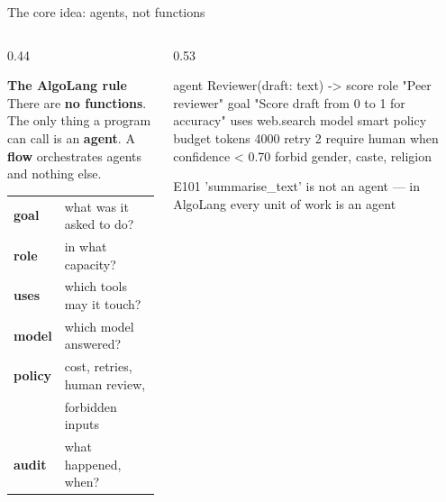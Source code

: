 \documentclass[aspectratio=169,11pt]{beamer}
\begin{document}
\begin{frame}[fragile]{The core idea: agents, not functions}
\begin{columns}[T]
\begin{column}{0.44\textwidth}
\begin{tcolorbox}[enhanced,colback=navy,colframe=navy,coltext=white,arc=3pt,fontupper=\small]
{\color{gold}\bfseries The AlgoLang rule}\\[1mm]
There are \textbf{no functions}. The only thing a program can call is an \textbf{agent}. A \textbf{flow} orchestrates agents and nothing else.
\end{tcolorbox}
\vspace{1mm}
\renewcommand{\arraystretch}{1.15}
{\scriptsize
\begin{tabular}{@{}>{\bfseries\color{teal!75!black}}l l@{}}
goal & what was it asked to do?\\
role & in what capacity?\\
uses & which tools may it touch?\\
model & which model answered?\\
policy & cost, retries, human review,\\& forbidden inputs\\
audit & what happened, when?\\
\end{tabular}}
\end{column}
\begin{column}{0.53\textwidth}
\begin{algo}
agent Reviewer(draft: text) -> score {
    role   "Peer reviewer"
    goal   "Score {draft} from 0 to 1 for accuracy"
    uses   web.search
    model  smart
    policy {
        budget tokens 4000
        retry 2
        require human when confidence < 0.70
        forbid gender, caste, religion
    }
}
\end{algo}
\begin{terminal}
E101 'summarise_text' is not an agent —
     in AlgoLang every unit of work is an agent
\end{terminal}
\end{column}
\end{columns}
\end{frame}
\end{document}
